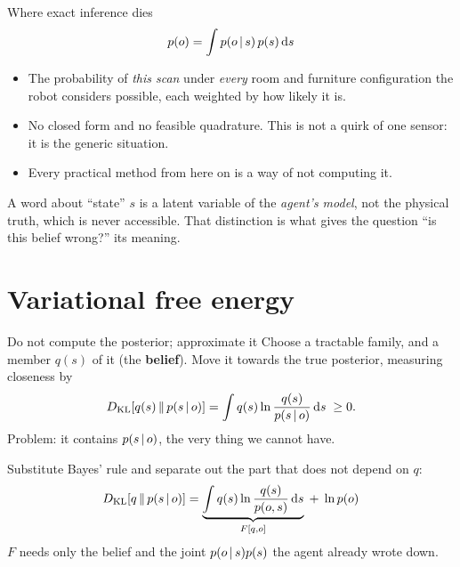 \documentclass[10pt, aspectratio=169]{beamer}
\begin{document}
\begin{frame}{Where exact inference dies}
  \[ p(o) = \int p(o\,|\, s)\,p(s)\,\mathrm{d}s \]
  \begin{itemize}
    \item The probability of \emph{this scan} under \emph{every} room and furniture configuration
          the robot considers possible, each weighted by how likely it is.
    \item No closed form and no feasible quadrature. This is not a quirk of one sensor: it is the
          generic situation.
    \item Every practical method from here on is a way of \alert{not computing it}.
  \end{itemize}
  \vspace{0.8em}
  \begin{block}{A word about ``state''}
    $s$ is a latent variable of the \emph{agent's model}, not the physical truth, which is never
    accessible. That distinction is what gives the question ``is this belief wrong?'' its meaning.
  \end{block}
\end{frame}

\section{Variational free energy}

\begin{frame}{Do not compute the posterior; approximate it}
  Choose a tractable family, and a member $q(s)$ of it (the \textbf{belief}). Move it towards
  the true posterior, measuring closeness by
  \[ D_{\mathrm{KL}}\!\left[q(s)\,\middle\|\,p(s\,|\, o)\right] = \int q(s) \ln\frac{q(s)}{p(s\,|\, o)}\,\mathrm{d}s \;\ge 0 . \]
  \pause
  \alert{Problem:} it contains $p(s\,|\, o)$, the very thing we cannot have.

  \pause
  \vspace{0.5em}
  Substitute Bayes' rule and separate out the part that does not depend on $q$:
  \[
    D_{\mathrm{KL}}\!\left[q\,\middle\|\,p(s\,|\, o)\right] = \underbrace{\int q(s)\ln\frac{q(s)}{p(o,s)}\,\mathrm{d}s}_{F[q,o]} \;+\; \ln p(o)
  \]
  $F$ needs only the belief and the joint $p(o\,|\, s)p(s)$ the agent already wrote down.
\end{frame}
\end{document}
